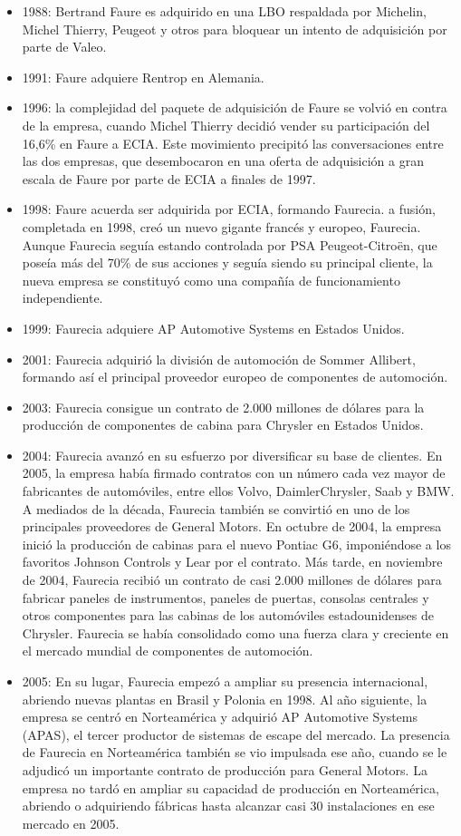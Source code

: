 \documentclass[letterpaper,12pt]{article}
\begin{document}
\begin{sloppypar}
\begin{itemize}
    \item 1988: Bertrand Faure es adquirido en una LBO respaldada por Michelin, Michel Thierry, Peugeot y otros para bloquear un intento de adquisición por parte de Valeo.
    \item 1991: Faure adquiere Rentrop en Alemania.
    \item 1996:  la complejidad del paquete de adquisición de Faure se volvió en contra de la empresa, cuando Michel Thierry decidió vender su participación del 16,6\% en Faure a ECIA. Este movimiento precipitó las conversaciones entre las dos empresas, que desembocaron en una oferta de adquisición a gran escala de Faure por parte de ECIA a finales de 1997. 
    \item 1998: Faure acuerda ser adquirida por ECIA, formando Faurecia. a fusión, completada en 1998, creó un nuevo gigante francés y europeo, Faurecia. Aunque Faurecia seguía estando controlada por PSA Peugeot-Citroën, que poseía más del 70\% de sus acciones y seguía siendo su principal cliente, la nueva empresa se constituyó como una compañía de funcionamiento independiente.
    \item 1999: Faurecia adquiere AP Automotive Systems en Estados Unidos.
    \item 2001: Faurecia adquirió la división de automoción de Sommer Allibert, formando así el principal proveedor europeo de componentes de automoción.
    \item 2003: Faurecia consigue un contrato de 2.000 millones de dólares para la producción de componentes de cabina para Chrysler en Estados Unidos.
    \item 2004: Faurecia avanzó en su esfuerzo por diversificar su base de clientes. En 2005, la empresa había firmado contratos con un número cada vez mayor de fabricantes de automóviles, entre ellos Volvo, DaimlerChrysler, Saab y BMW. A mediados de la década, Faurecia también se convirtió en uno de los principales proveedores de General Motors. En octubre de 2004, la empresa inició la producción de cabinas para el nuevo Pontiac G6, imponiéndose a los favoritos Johnson Controls y Lear por el contrato. Más tarde, en noviembre de 2004, Faurecia recibió un contrato de casi 2.000 millones de dólares para fabricar paneles de instrumentos, paneles de puertas, consolas centrales y otros componentes para las cabinas de los automóviles estadounidenses de Chrysler. Faurecia se había consolidado como una fuerza clara y creciente en el mercado mundial de componentes de automoción.
    \item 2005: En su lugar, Faurecia empezó a ampliar su presencia internacional, abriendo nuevas plantas en Brasil y Polonia en 1998. Al año siguiente, la empresa se centró en Norteamérica y adquirió AP Automotive Systems (APAS), el tercer productor de sistemas de escape del mercado. La presencia de Faurecia en Norteamérica también se vio impulsada ese año, cuando se le adjudicó un importante contrato de producción para General Motors. La empresa no tardó en ampliar su capacidad de producción en Norteamérica, abriendo o adquiriendo fábricas hasta alcanzar casi 30 instalaciones en ese mercado en 2005.

\end{itemize}
\end{sloppypar}
\end{document}

